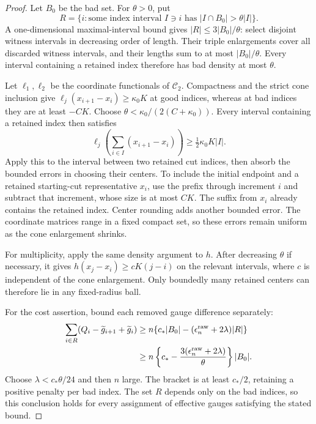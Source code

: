 \begin{proof}
Let \(B_0\) be the bad set. For \(\theta>0\), put
\[
 R=\{i:\text{some index interval }I\ni i
                    \text{ has }|I\cap B_0|>\theta|I|\}.
\]
A one-dimensional maximal-interval bound gives
\(|R|\le3|B_0|/\theta\): select disjoint witness intervals in
decreasing order of length. Their triple enlargements cover all
discarded witness intervals, and their lengths sum to at most
\(|B_0|/\theta\). Every interval containing a retained index
therefore has bad density at most \(\theta\).

Let \(\ell_1,\ell_2\) be the coordinate functionals of
\(\mathcal C_2\). Compactness and the strict cone inclusion give
\(\ell_j(x_{i+1}-x_i)\ge\kappa_0K\) at good indices, whereas at bad
indices they are at least \(-CK\). Choose
\(\theta<\kappa_0/(2(C+\kappa_0))\). Every interval containing a
retained index then satisfies
\[
 \ell_j\left(\sum_{i\in I}(x_{i+1}-x_i)\right)
                      \ge\tfrac12\kappa_0K|I|.
\]
Apply this to the interval between two retained cut indices, then
absorb the bounded errors in choosing their centers. To include the
initial endpoint and a retained starting-cut representative \(x_i\),
use the prefix through increment \(i\) and subtract that increment,
whose size is at most \(CK\). The suffix from \(x_i\) already contains
the retained index. Center rounding adds another bounded error.
The coordinate matrices range in a fixed compact set, so these errors
remain uniform as the cone enlargement shrinks.

For multiplicity, apply the same density argument to \(h\). After
decreasing \(\theta\) if necessary, it gives
\(h(x_j-x_i)\ge cK(j-i)\) on the relevant intervals, where \(c\) is
independent of the cone enlargement. Only boundedly many retained
centers can therefore lie in any fixed-radius ball.

For the cost assertion, bound each removed gauge difference separately:
\begin{align*}
 \sum_{i\in R}(Q_i-\widetilde g_{i+1}+\widetilde g_i)
 &\ge n\{c_*|B_0|-(\epsilon_n^{\rm raw}+2\lambda)|R|\}\\
 &\ge n\left\{c_*-\frac{3(\epsilon_n^{\rm raw}+2\lambda)}{\theta}\right\}|B_0|.
\end{align*}
Choose \(\lambda<c_*\theta/24\) and then \(n\) large. The bracket is
at least \(c_*/2\), retaining a positive penalty per bad index.
The set \(R\) depends only on the bad indices, so this conclusion
holds for every assignment of effective gauges satisfying the stated
bound.
\end{proof}

